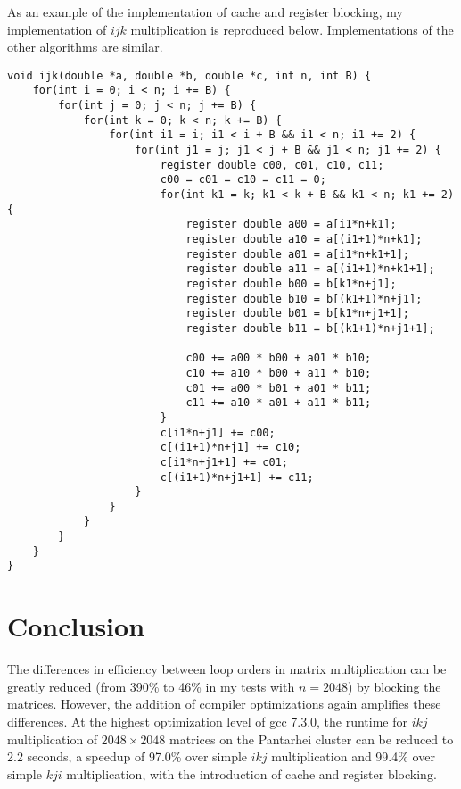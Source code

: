 \documentclass[12pt,letterpaper,oneside]{article}
\begin{document}
As an example of the implementation of cache and register blocking, my implementation of $ijk$ multiplication is reproduced below. Implementations of the other algorithms are similar.
\begin{verbatim}
void ijk(double *a, double *b, double *c, int n, int B) {
	for(int i = 0; i < n; i += B) {
		for(int j = 0; j < n; j += B) {
			for(int k = 0; k < n; k += B) {
				for(int i1 = i; i1 < i + B && i1 < n; i1 += 2) {
					for(int j1 = j; j1 < j + B && j1 < n; j1 += 2) {
						register double c00, c01, c10, c11;
						c00 = c01 = c10 = c11 = 0;
						for(int k1 = k; k1 < k + B && k1 < n; k1 += 2) {
							register double a00 = a[i1*n+k1];
							register double a10 = a[(i1+1)*n+k1];
							register double a01 = a[i1*n+k1+1];
							register double a11 = a[(i1+1)*n+k1+1];
							register double b00 = b[k1*n+j1];
							register double b10 = b[(k1+1)*n+j1];
							register double b01 = b[k1*n+j1+1];
							register double b11 = b[(k1+1)*n+j1+1];
							
							c00 += a00 * b00 + a01 * b10;
							c10 += a10 * b00 + a11 * b10;
							c01 += a00 * b01 + a01 * b11;
							c11 += a10 * a01 + a11 * b11;
						}
						c[i1*n+j1] += c00;
						c[(i1+1)*n+j1] += c10;
						c[i1*n+j1+1] += c01;
						c[(i1+1)*n+j1+1] += c11;
					}
				}
			}
		}
	}
}
\end{verbatim}

\section*{Conclusion}
The differences in efficiency between loop orders in matrix multiplication can be greatly reduced (from 390\% to 46\% in my tests with $n=2048$)
by blocking the matrices. However, the addition of compiler optimizations again amplifies these differences. At the highest optimization level of gcc 7.3.0,
the runtime for $ikj$ multiplication of $2048\times2048$ matrices on the Pantarhei cluster can be reduced
to 2.2 seconds, a speedup of 97.0\% over simple $ikj$ multiplication and 99.4\% over simple $kji$ multiplication, with the introduction of cache and register blocking.
 
\end{document}
